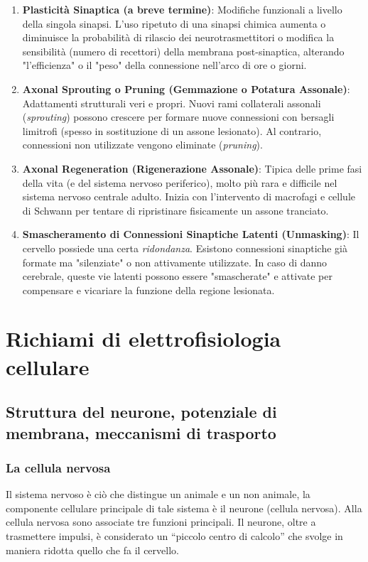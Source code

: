 \begin{enumerate}
    \item \textbf{Plasticità Sinaptica (a breve termine)}: Modifiche funzionali a livello della singola sinapsi. L'uso ripetuto di una sinapsi chimica aumenta o diminuisce la probabilità di rilascio dei neurotrasmettitori o modifica la sensibilità (numero di recettori) della membrana post-sinaptica, alterando "l'efficienza" o il "peso" della connessione nell'arco di ore o giorni.
    \item \textbf{Axonal Sprouting o Pruning (Gemmazione o Potatura Assonale)}: Adattamenti strutturali veri e propri. Nuovi rami collaterali assonali (\textit{sprouting}) possono crescere per formare nuove connessioni con bersagli limitrofi (spesso in sostituzione di un assone lesionato). Al contrario, connessioni non utilizzate vengono eliminate (\textit{pruning}).
    \item \textbf{Axonal Regeneration (Rigenerazione Assonale)}: Tipica delle prime fasi della vita (e del sistema nervoso periferico), molto più rara e difficile nel sistema nervoso centrale adulto. Inizia con l'intervento di macrofagi e cellule di Schwann per tentare di ripristinare fisicamente un assone tranciato.
    \item \textbf{Smascheramento di Connessioni Sinaptiche Latenti (Unmasking)}: Il cervello possiede una certa \textit{ridondanza}. Esistono connessioni sinaptiche già formate ma "silenziate" o non attivamente utilizzate. In caso di danno cerebrale, queste vie latenti possono essere "smascherate" e attivate per compensare e vicariare la funzione della regione lesionata.
\end{enumerate}

\chapter{Richiami di elettrofisiologia cellulare}

\section{Struttura del neurone, potenziale di membrana, meccanismi di trasporto}

\subsection{La cellula nervosa}
Il sistema nervoso è ciò che distingue un animale e un non animale, la componente cellulare principale di tale sistema è il neurone (cellula nervosa).
Alla cellula nervosa sono associate tre funzioni principali. Il neurone, oltre a trasmettere impulsi, è considerato un ``piccolo centro di calcolo'' che svolge in maniera ridotta quello che fa il cervello.


